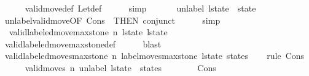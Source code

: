 \begin{isabellebody}
\ \ \ \ \isamarkupfalse%
\ valid{\isacharunderscore}move{\isacharprime}{\isacharunderscore}def\ Let{\isacharunderscore}def\isanewline
\ \ \ \ \isamarkupfalse%
\ simp\isanewline
\ \ \isamarkupfalse%
\ \isamarkupfalse%
\ {\isacharasterisk}{\isacharcolon}\ {\isachardoublequoteopen}unlabel\ {\isacharquery}l{\isacharunderscore}state{\isacharprime}\ {\isacharequal}\ state{\isacharprime}{\isachardoublequoteclose}\isanewline
\ \ \ \ \isamarkupfalse%
\ unlabel{\isacharunderscore}valid{\isacharunderscore}move{\isacharprime}{\isacharbrackleft}OF\ Cons{\isacharparenleft}{}{\isacharparenright}\ {\isacharasterisk}{\isacharasterisk}{\isacharcomma}\ THEN\ conjunct{}{\isacharbrackright}\isanewline
\ \ \ \ \isamarkupfalse%
\ simp\isanewline
\isanewline
\ \ \isamarkupfalse%
\ {\isacharasterisk}{\isacharasterisk}{\isacharasterisk}{\isacharcolon}\ {\isachardoublequoteopen}valid{\isacharunderscore}labeled{\isacharunderscore}move{\isacharunderscore}max{\isacharunderscore}stone\ n\ l{\isacharunderscore}state\ {\isacharquery}l{\isacharunderscore}state{\isacharprime}{\isachardoublequoteclose}\isanewline
\ \ \ \ \isamarkupfalse%
\ {\isacharasterisk}{\isacharasterisk}\isanewline
\ \ \ \ \isamarkupfalse%
\ valid{\isacharunderscore}labeled{\isacharunderscore}move{\isacharunderscore}max{\isacharunderscore}stone{\isacharunderscore}def\isanewline
\ \ \ \ \isamarkupfalse%
\ blast\isanewline
\isanewline
\ \ \isamarkupfalse%
\ {\isachardoublequoteopen}valid{\isacharunderscore}labeled{\isacharunderscore}moves{\isacharunderscore}max{\isacharunderscore}stone\ n\ {\isacharparenleft}label{\isacharunderscore}moves{\isacharunderscore}max{\isacharunderscore}stone\ {\isacharquery}l{\isacharunderscore}state{\isacharprime}\ states{\isacharparenright}{\isachardoublequoteclose}\isanewline
\ \ \isamarkupfalse%
\ {\isacharparenleft}rule\ Cons{\isacharparenleft}{}{\isacharparenright}{\isacharparenright}\isanewline
\ \ \ \ \isamarkupfalse%
\ {\isachardoublequoteopen}valid{\isacharunderscore}moves\ n\ {\isacharparenleft}{\isacharparenleft}unlabel\ {\isacharquery}l{\isacharunderscore}state{\isacharprime}{\isacharparenright}\ {\isacharhash}\ states{\isacharparenright}{\isachardoublequoteclose}\isanewline
\ \ \ \ \ \ \isamarkupfalse%
\ Cons{\isacharparenleft}{}{\isacharparenright}\ {\isacharasterisk}\isanewline
\ \ \ \ \ \ \isamarkupfalse%

\end{isabellebody}
